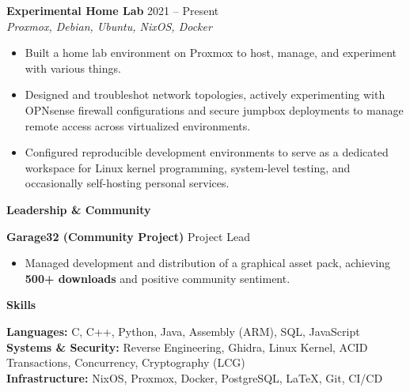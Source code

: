 \documentclass[10pt]{article}
\begin{document}
\textbf{Experimental Home Lab} \hfill 2021 -- Present \\
\textit{Proxmox, Debian, Ubuntu, NixOS, Docker}
\begin{itemize}[noitemsep, topsep=0pt, partopsep=0pt, parsep=0pt]
  \item Built a home lab environment on Proxmox to host, manage, and experiment with various things.
  \item Designed and troubleshot network topologies, actively experimenting with OPNsense firewall configurations and secure jumpbox deployments to manage remote access across virtualized environments.
  \item Configured reproducible development environments to serve as a dedicated workspace for Linux kernel programming, system-level testing, and occasionally self-hosting personal services.
\end{itemize}

\vspace{3pt}

\begin{center}
    \textbf{\large Leadership \& Community}
\end{center}
\vspace{-5pt}

\textbf{Garage32 (Community Project)} \hfill Project Lead \\
\vspace{-2pt}
\begin{itemize}[noitemsep, topsep=0pt, partopsep=0pt, parsep=0pt]
  \item Managed development and distribution of a graphical asset pack, achieving \textbf{500+ downloads} and positive community sentiment.
\end{itemize}

\vspace{5pt}

\begin{center}
    \textbf{\large Skills}
\end{center}
\vspace{-5pt}

\textbf{Languages:} C, C++, Python, Java, Assembly (ARM), SQL, JavaScript \\
\textbf{Systems \& Security:} Reverse Engineering, Ghidra, Linux Kernel, ACID Transactions, Concurrency, Cryptography (LCG) \\
\textbf{Infrastructure:} NixOS, Proxmox, Docker, PostgreSQL, LaTeX, Git, CI/CD
\end{document}
